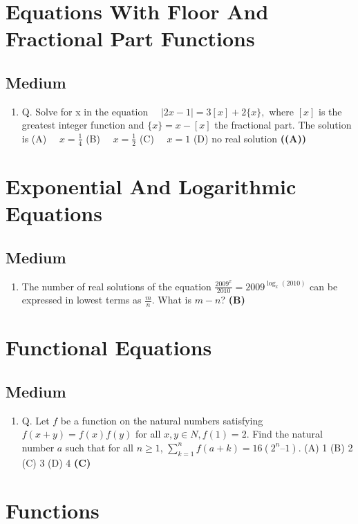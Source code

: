 \documentclass{article}
\begin{document}
\section{Equations With Floor And Fractional Part Functions}
\subsection{Medium}
\begin{enumerate}
\item Q. Solve for x in the equation
$\quad |2x-1| = 3[x] + 2\{x\},$
where $[x]$ is the greatest integer function and $ \{x\} = x-[x]$ the fractional part. The solution
is
(A) $\quad x=\frac{1}{4}$
(B) $\quad x=\frac{1}{2}$
(C) $\quad x=1$
(D) no real solution \hfill \textbf{((A))}
\end{enumerate}
\section{Exponential And Logarithmic Equations}
\subsection{Medium}
\begin{enumerate}
\item The number of real solutions of the equation $\frac{2009^x}{2010} = 2009^{\log_x (2010)}$ can be expressed in lowest terms as $\frac{m}{n}$. What is $m - n$? \hfill \textbf{(B)}
\end{enumerate}
\section{Functional Equations}
\subsection{Medium}
\begin{enumerate}
\item Q. Let $f$ be a function on the natural numbers satisfying
$f(x + y) = f(x) f(y)$ for all $x, y \in N, f(1) = 2$.
Find the natural number $a$ such that for all $n \geq 1$,
$\sum_{k=1}^{n} f(a+k) = 16(2^n – 1)$.
(A) 1
(B) 2
(C) 3
(D) 4 \hfill \textbf{(C)}
\end{enumerate}
\section{Functions}
\end{document}
